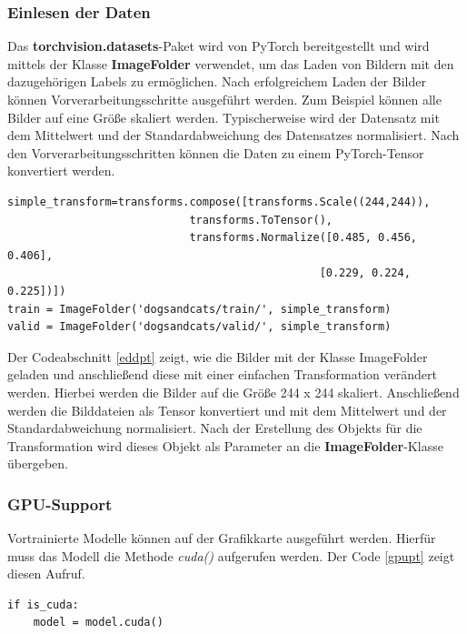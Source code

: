 \subsubsection{Einlesen der Daten}

Das \textbf{torchvision.datasets}-Paket wird von PyTorch bereitgestellt und wird mittels der Klasse \textbf{ImageFolder} verwendet, um das Laden von Bildern mit den dazugehörigen Labels zu ermöglichen. Nach erfolgreichem Laden der Bilder können Vorverarbeitungsschritte ausgeführt werden. Zum Beispiel können alle Bilder auf eine Größe skaliert werden. Typischerweise wird der Datensatz mit dem Mittelwert und der Standardabweichung des Datensatzes normalisiert. Nach den Vorverarbeitungsschritten können die Daten zu einem PyTorch-Tensor konvertiert werden. 

\begin{lstlisting}[caption={Das Einlesen der Bilddateien wird mit der Klasse \textit{ImageFolder} realisiert\cite{Subramanian2018}.}, label=eddpt]
simple_transform=transforms.compose([transforms.Scale((244,244)),
							transforms.ToTensor(),
							transforms.Normalize([0.485, 0.456, 0.406],
												[0.229, 0.224, 0.225])])
train = ImageFolder('dogsandcats/train/', simple_transform)
valid = ImageFolder('dogsandcats/valid/', simple_transform)
\end{lstlisting}

Der Codeabschnitt \ref{eddpt} zeigt, wie die Bilder mit der Klasse ImageFolder geladen und anschließend diese mit einer einfachen Transformation verändert werden. Hierbei werden die Bilder auf die Größe 244 x 244 skaliert. Anschließend werden die Bilddateien als Tensor konvertiert und mit dem Mittelwert und der Standardabweichung normalisiert. Nach der Erstellung des Objekts für die Transformation wird dieses Objekt als Parameter an die \textbf{ImageFolder}-Klasse übergeben.

\subsubsection{GPU-Support}

Vortrainierte Modelle können auf der Grafikkarte ausgeführt werden. Hierfür muss das Modell die Methode \textit{cuda()} aufgerufen werden. Der Code \ref{gpupt} zeigt diesen Aufruf. 

\begin{lstlisting}[caption={Mit der \textit{cuda()}-Methode wird das Modell auf der Grafikkarte trainiert\cite{Subramanian2018}.}, label=gpupt]
if is_cuda:
	model = model.cuda()
\end{lstlisting}

